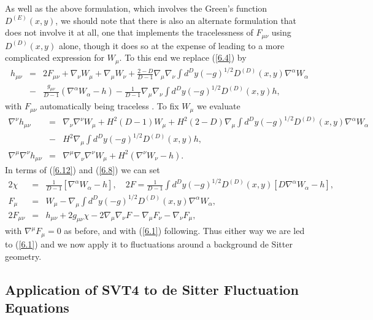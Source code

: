 \documentclass[aps,onecolumn,10pt]{revtex4}
\numberwithin{equation}{section}
\numberwithin{equation}{section}
\begin{document}
As well as the above formulation, which involves the Green's function $D^{(E)}(x,y)$, we should note that there is also an alternate formulation that does not involve it at all, one that implements the tracelessness of $F_{\mu\nu}$ using $D^{(D)}(x,y)$ alone, though it does so at the expense of leading to a more complicated expression for $W_{\mu}$. To this end we replace (\ref{6.4}) by 
%
\begin{eqnarray}
h_{\mu\nu}&=&2F_{\mu\nu}+\nabla_{\nu}W_{\mu}+\nabla_{\mu}W_{\nu}+\frac{2-D}{D-1}\nabla_{\mu}\nabla_{\nu}\int d^Dy(-g)^{1/2}D^{(D)}(x,y)\nabla^{\alpha}W_{\alpha}
\nonumber\\
&-&\frac{g_{\mu\nu}}{D-1}(\nabla^{\alpha}W_{\alpha}-h)-\frac{1}{D-1}\nabla_{\mu}\nabla_{\nu}\int d^Dy(-g)^{1/2}D^{(D)}(x,y)h,
\label{6.12}
\end{eqnarray}
%
with $F_{\mu\nu}$ automatically being traceless \cite{footnote8}. To fix $W_{\mu}$ we evaluate 
%
\begin{eqnarray}
\nabla^{\nu}h_{\mu\nu}&=&\nabla_{\nu}\nabla^{\nu}W_{\mu}+H^2(D-1)W_{\mu}
+H^2(2-D)\nabla_{\mu}\int d^Dy(-g)^{1/2}D^{(D)}(x,y)\nabla^{\alpha}W_{\alpha}
\nonumber\\
&-&H^2\nabla_{\mu}\int d^Dy(-g)^{1/2}D^{(D)}(x,y)h,
\nonumber\\
\nabla^{\mu}\nabla^{\nu}h_{\mu\nu}&=&\nabla^{\mu}\nabla_{\nu}\nabla^{\nu}W_{\mu}+H^2(\nabla^{\nu}W_{\nu}-h).
\label{6.13}
\end{eqnarray}
%
In terms of (\ref{6.12}) and (\ref{6.8}) we can set 
%
\begin{eqnarray}
2\chi&=&\frac{1}{D-1}[\nabla^{\alpha}W_{\alpha}-h],\quad 2F=\frac{1}{D-1}\int d^Dy(-g)^{1/2}D^{(D)}(x,y)[D\nabla^{\alpha}W_{\alpha}-h],
\nonumber\\
F_{\mu}&=&W_{\mu}-\nabla_{\mu}\int d^Dy(-g)^{1/2}D^{(D)}(x,y)\nabla^{\alpha}W_{\alpha},
\nonumber\\
2F_{\mu\nu}&=&h_{\mu\nu}+2g_{\mu\nu}\chi-2\nabla_{\mu}\nabla_{\nu}F
- \nabla_{\mu}F_{\nu}-\nabla_{\nu}F_{\mu},
\label{6.14}
\end{eqnarray}
%
with $\nabla^{\mu}F_{\mu}=0$ as before, and with (\ref{6.1}) following. Thus either way we are led to (\ref{6.1}) and we now apply it to fluctuations around a background de Sitter geometry.

\subsection{Application of SVT4 to de Sitter Fluctuation Equations}
\end{document}
